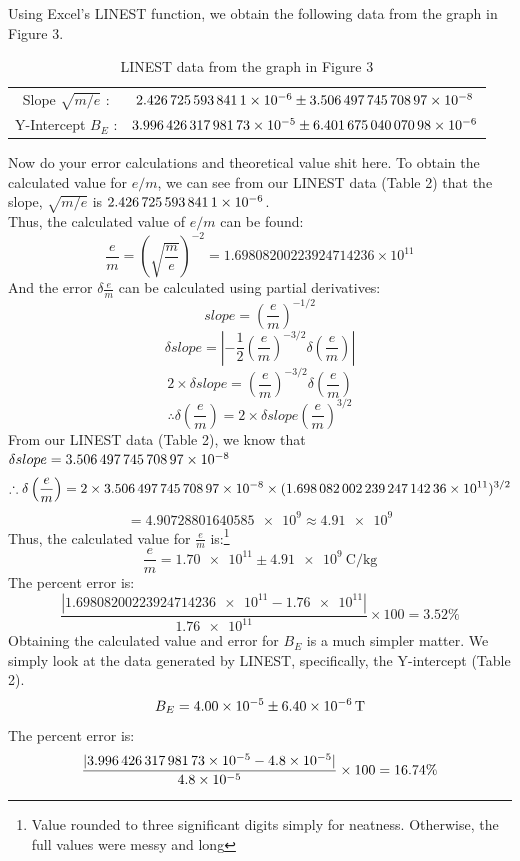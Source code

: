 \documentclass[letterpaper]{article}
\begin{document}
\newpage
\noindent Using Excel's LINEST function, we obtain the following data from the graph in Figure 3.
\begin{table}[H]
\centering
\begin{tabular}{cc}
  Slope $\sqrt{m/e}$ : &  $\num{2.4267255938411E-06}\pm \num{3.50649774570897E-08}$ \\
  Y-Intercept $B_E$   :&  $\num{3.99642631798173E-05}\pm \num{6.40167504007098E-06}$ \\
\end{tabular}
\caption{LINEST data from the graph in Figure 3}
\end{table}

Now do your error calculations and theoretical value shit here.
\noindent To obtain the calculated value for $e/m$, we can see from our LINEST data (Table 2) that the slope, $\sqrt{m/e}$ is
$\num{2.4267255938411E-06}$.\\
Thus, the calculated value of $e/m$ can be found:
$$ \frac{e}{m} = \left(\sqrt{\frac{m}{e}}\right)^{-2} = 1.69808200223924714236 \times 10^{11} $$
And the error $\delta \frac{e}{m}$ can be calculated using partial derivatives:
$$slope= \left(\frac{e}{m}\right)^{-1/2}$$
$$\delta slope = \left| -\frac{1}{2} \left(\frac{e}{m}\right)^{-3/2} \delta \left(\frac{e}{m}\right)\right|$$
$$ 2 \times \delta slope = \left(\frac{e}{m}\right)^{-3/2} \delta \left(\frac{e}{m}\right) $$
$$ \therefore \delta \left(\frac{e}{m}\right) = 2 \times \delta slope \left(\frac{e}{m}\right)^{3/2}$$
From our LINEST data (Table 2), we know that $\delta slope = \num{3.50649774570897E-08} $
$$ \therefore \delta \left(\frac{e}{m}\right) = 2 \times \num{3.50649774570897E-08} \times (\num{1.69808200223924714236e11})^{3/2}$$
$$= \num{4.90728801640585e9} \approx \num{4.91e9}$$
Thus, the calculated value for $\frac{e}{m}$ is:\footnote{Value rounded to three significant digits simply for neatness. Otherwise, the full values were messy and long}
$$\frac{e}{m}=\num{1.70e11} \pm \SI{4.91e9}{\coulomb\per\kilogram}$$
The percent error is:
$$ \frac{|\num{1.69808200223924714236e11}-\num{1.76e11}|}{\num{1.76e11}}\times100 = 3.52\%$$
Obtaining the calculated value and error for $B_E$ is a much simpler matter. We simply
look at the data generated by LINEST, specifically, the Y-intercept (Table 2).
$$B_E = \num{4.00E-05}\pm \SI{6.40E-06}{\tesla}$$
The percent error is:
$$ \frac{|\num{3.99642631798173E-05}-\num{4.8e-5}|}{\num{4.8e-5}}\times100 = 16.74\%$$
\end{document}
